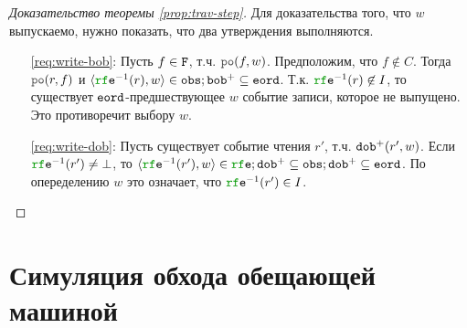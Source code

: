 \begin{proof}[Доказательство теоремы \ref{prop:trav-step}]
  Для доказательства того, что $w$ выпускаемо, нужно показать, что два утверждения выполняются.
  \begin{itemize}
    \item[\ref{req:write-bob}:] Пусть $f \in {\mathtt{F}}$, т.ч. $\lPO(f, w)$.
      Предположим, что $f \nin C$. Тогда $\lPO(r, f)$ и $\tup{\lRFE^{-1}{(r)}, w} \in \lOBS; \lBOB^{+} \suq \lEORD$.
      Т.к. $\lRFE^{-1}(r) \nin \IssuedSet$, то существует ${\mathtt{eord}}$-предшествующее $w$ событие записи, которое не выпущено.
      Это противоречит выбору $w$.
    \item[\ref{req:write-dob}:] Пусть существует событие чтения $r'$, т.ч. ${\mathtt{dob}}^{+}(r', w)$.
      Если $\lRFE^{-1}(r') \neq \bot$, то
      $\tup{\lRFE^{-1}(r'), w} \in \lRFE; \lDOB^{+} \suq \lOBS; \lDOB^{+} \suq \lEORD$. По опеределению $w$ это означает,
      что $\lRFE^{-1}(r') \in \IssuedSet$.
\qedhere
\end{itemize}  
\end{proof}

\section{Симуляция обхода обещающей машиной}
\label{sec:simulation}

